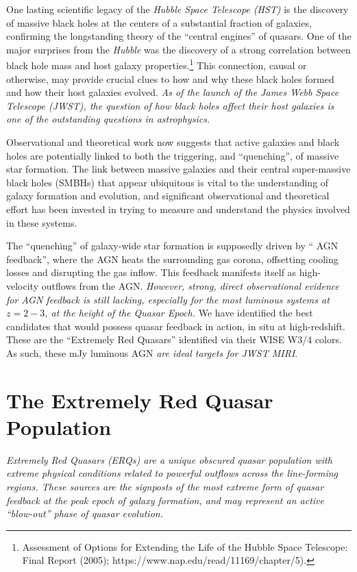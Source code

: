 One lasting scientific legacy of the {\it Hubble Space Telescope
(HST)} is the discovery of massive black holes at the centers of a
substantial fraction of galaxies, confirming the longstanding theory
of the ``central engines'' of quasars.  One of the major surprises
from the {\it Hubble} was the discovery of a strong correlation
between black hole mass and host galaxy
properties.\footnote{Assessment of Options for Extending the Life of
the Hubble Space Telescope: Final Report (2005);
https://www.nap.edu/read/11169/chapter/5).}  This connection, causal
or otherwise, may provide crucial clues to how and why these black
holes formed and how their host galaxies evolved. {\it As of the
launch of the James Webb Space Telescope (JWST), the question of how
black holes affect their host galaxies is one of the outstanding
questions in astrophysics.}

\smallskip \smallskip
\noindent
Observational and theoretical work now suggests that active galaxies
and black holes are potentially linked to both the triggering, and
``quenching'', of massive star formation. The link between massive
galaxies and their central super-massive black holes (SMBHs) that appear
ubiquitous is vital to the understanding of galaxy formation and
evolution, and significant observational and theoretical effort has
been invested in trying to measure and understand the physics involved
in these systems.  

\smallskip \smallskip
\noindent
The ``quenching'' of galaxy-wide star formation is supposedly driven
by `` AGN feedback'', where the AGN heats the surrounding gas corona,
offsetting cooling losses and disrupting the gas inflow. This feedback
manifests itself as high-velocity outflows from the AGN.  {\it However,
strong, direct observational evidence for AGN feedback is still lacking,
especially for the most luminous systems at $z=2-3$, at the height of
the Quasar Epoch.}  We have identified the best candidates that would
possess quasar feedback in action, in situ at high-redshift. These are
the ``Extremely Red Quasars'' identified via their WISE W3/4 colors.
As such, these mJy luminous AGN {\it are ideal targets for JWST MIRI}.


\section*{The Extremely Red Quasar Population} 
{\it Extremely Red Quasars (ERQs) are a unique obscured quasar
population with extreme physical conditions related to powerful
outflows across the line-forming regions. These sources are the
signposts of the most extreme form of quasar feedback at the peak
epoch of galaxy formation, and may represent an active ``blow-out''
phase of quasar evolution.}

